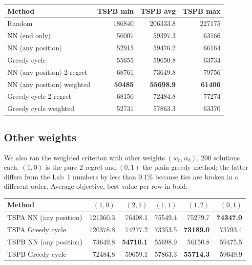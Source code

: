 \documentclass[11pt,a4paper]{article}
\begin{document}
\begin{table}[H]
\centering
\begin{tabular}{lrrr}
\toprule
Method & TSPB min & TSPB avg & TSPB max \\
\midrule
Random & 186840 & 206333.8 & 227175 \\
NN (end only) & 56007 & 59397.3 & 63166 \\
NN (any position) & 52915 & 59476.2 & 66164 \\
Greedy cycle & 55655 & 59650.8 & 63734 \\
\midrule
NN (any position) 2-regret & 68761 & 73649.8 & 79756 \\
NN (any position) weighted & \textbf{50485} & \textbf{55698.9} & \textbf{61406} \\
Greedy cycle 2-regret & 68150 & 72484.8 & 77274 \\
Greedy cycle weighted & 52731 & 57863.3 & 63370 \\
\bottomrule
\end{tabular}
\end{table}

\subsection*{Other weights}
We also ran the weighted criterion with other weights $(w_r, w_b)$, 200 solutions each.
$(1, 0)$ is the pure 2-regret and $(0, 1)$ the plain greedy method; the latter differs from the
Lab~1 numbers by less than 0.1\% because ties are broken in a different order.
Average objective, best value per row in bold:

\begin{table}[H]
\centering
\begin{tabular}{lrrrrr}
\toprule
Method & $(1, 0)$ & $(2, 1)$ & $(1, 1)$ & $(1, 2)$ & $(0, 1)$ \\
\midrule
TSPA NN (any position) & 121360.3 & 76408.1 & 75549.4 & 75279.7 & \textbf{74347.0} \\
TSPA Greedy cycle      & 120378.8 & 74277.2 & 73353.5 & \textbf{73189.0} & 73793.4 \\
TSPB NN (any position) & 73649.8 & \textbf{54710.1} & 55698.9 & 56150.8 & 59475.5 \\
TSPB Greedy cycle      & 72484.8 & 59659.1 & 57863.3 & \textbf{55714.3} & 59649.9 \\
\bottomrule
\end{tabular}
\end{table}

\end{document}
